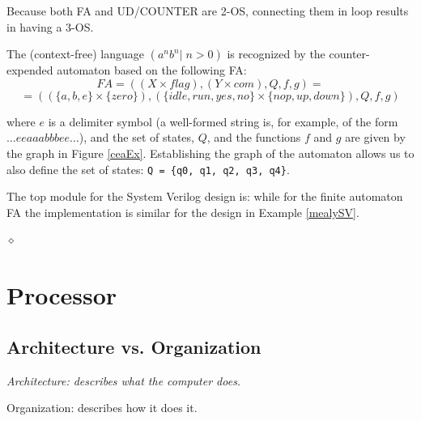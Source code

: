Because both FA and UD/COUNTER are 2-OS, connecting them in loop results in having a 3-OS.

\begin{exemplu}
The (context-free) language $(a^nb^n | \; n>0)$ is recognized by the  counter-expended automaton based on the following FA:
$$FA = ((X \times flag),(Y \times com),Q,f,g) =$$ 
$$= ((\{a,b,e\} \times \{zero\}), (\{idle, run, yes, no\} \times \{nop, up, down\}), Q, f, g)$$


\hspace{-6mm}where $e$ is a delimiter symbol (a well-formed string is, for example, of the form $\ldots eeaaabbbee\ldots$),  and the set of states, $Q$, and the functions $f$ and $g$ are given by the graph in Figure \ref{ceaEx}. Establishing the  graph of the automaton allows us to also define the set of states: {\tt Q = \{q0, q1, q2, q3, q4\}}.

The top module for the System Verilog design is:
{\em
{}
}
\hspace{-6mm}while for the finite automaton FA the implementation is similar for the design in Example \ref{mealySV}.

$\diamond$
\end{exemplu}


\section{Processor}

\subsection{Architecture vs. Organization}

{\small
 \hfill{
\begin{minipage}{8cm}
{\em Architecture: describes what the computer does.

Organization: describes how it does it.}
\end{minipage}
}}

